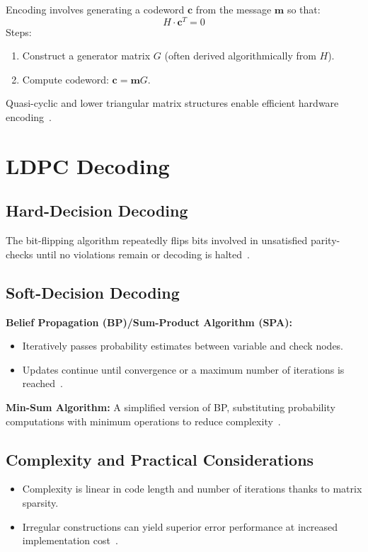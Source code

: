 \documentclass[../main.tex]{subfiles}
\begin{document}
Encoding involves generating a codeword $\mathbf{c}$ from the message $\mathbf{m}$ so that:
\begin{equation}
    H \cdot \mathbf{c}^T = 0
\end{equation}
Steps:
\begin{enumerate}
    \item Construct a generator matrix $G$ (often derived algorithmically from $H$).
    \item Compute codeword: $\mathbf{c} = \mathbf{m}G$.
\end{enumerate}
Quasi-cyclic and lower triangular matrix structures enable efficient hardware encoding~\cite{Zhang2021, Liu2012}.

\section{LDPC Decoding}

\subsection{Hard-Decision Decoding}
The bit-flipping algorithm repeatedly flips bits involved in unsatisfied parity-checks until no violations remain or decoding is halted~\cite{Karthikeyan2020, Schmalen2021}.

\subsection{Soft-Decision Decoding}
\textbf{Belief Propagation (BP)/Sum-Product Algorithm (SPA):}
\begin{itemize}
    \item Iteratively passes probability estimates between variable and check nodes.
    \item Updates continue until convergence or a maximum number of iterations is reached~\cite{Karthikeyan2020, Condo2019}.
\end{itemize}

\textbf{Min-Sum Algorithm:} A simplified version of BP, substituting probability computations with minimum operations to reduce complexity~\cite{NumberAnalytics2025}.

\subsection{Complexity and Practical Considerations}
\begin{itemize}
    \item Complexity is linear in code length and number of iterations thanks to matrix sparsity.
    \item Irregular constructions can yield superior error performance at increased implementation cost~\cite{NumberAnalytics2025, Condo2019}.
\end{itemize}
\end{document}
